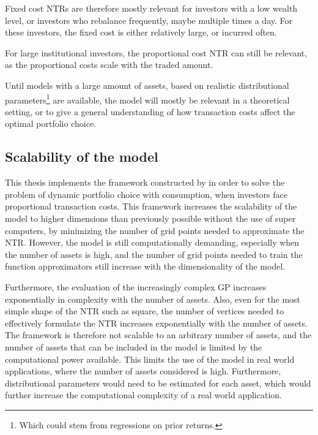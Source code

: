 \documentclass[11pt]{article}
\begin{document}
Fixed cost \ac{NTR}s are therefore mostly relevant for investors with a low wealth level, or investors who rebalance frequently, maybe multiple times a day.
For these investors, the fixed cost is either relatively large, or incurred often.

For large institutional investors, the proportional cost \ac{NTR} can still be relevant, as the proportional costs scale with the traded amount.

Until models with a large amount of assets, based on realistic distributional parameters\footnote{Which could stem from regressions on prior returns.} are available, the model will mostly be relevant in a theoretical setting,
or to give a general understanding of how transaction costs affect the optimal portfolio choice.

\subsection{Scalability of the model} \label{Subsection: Scalability of the model}
This thesis implements the framework constructed by \autocite{Scheidegger2023}
in order to solve the problem of dynamic portfolio choice with consumption,
when investors face proportional transaction costs. This framework increases the scalability of the model to higher dimensions
than previously possible without the use of super computers, by minimizing the number of grid points needed to approximate the NTR.
However, the model is still computationally demanding, especially when the number of assets is high, and the number of grid points
needed to train the function approximators still increase with the dimensionality of the model.

Furthermore, the evaluation of the increasingly complex \ac{GP} increases exponentially in complexity with the number of assets.
Also, even for the most simple shape of the \ac{NTR} such as square, the number of vertices needed to effectively 
formulate the \ac{NTR} increases exponentially with the number of assets.
The framework is therefore not scalable to an arbitrary number of assets, and the number of assets that can be included in the model is limited by the computational power available.
This limits the use of the model in real world applications, where the number of assets considered is high.
Furthermore, distributional parameters would need to be estimated for each asset, which would further increase the computational complexity of
a real world application.
\end{document}
